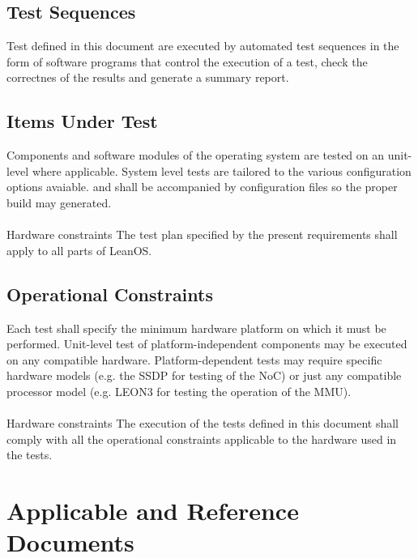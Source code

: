\section{Test Sequences}

Test defined in this document are executed by automated test sequences in the
form of software programs that control the execution of a test, check the
correctnes of the results and generate a summary report.



\section{Items Under Test}

Components and software modules of the operating system are tested on an
unit-level where applicable. System level tests are tailored to the
various configuration options avaiable. and shall be accompanied by
configuration files so the proper build may generated.\\
\\

 {Hardware constraints}{%
The test plan specified by the present requirements shall apply to all parts %
of LeanOS.
}{}



\section{Operational Constraints}

Each test shall specify the minimum hardware platform on which it must be
performed. Unit-level test of platform-independent components may be executed
on any compatible hardware. Platform-dependent tests may require specific
hardware models (e.g. the \gls{SSDP} for testing of the \gls{NoC}) or just any
compatible processor model (e.g. \gls{LEON3} for testing the operation of the
\gls{MMU}).\\
\\

 {Hardware constraints}{%
The execution of the tests defined in this document shall comply with all %
the operational constraints applicable to the hardware used in the tests.%
}{}



\chapter{Applicable and Reference Documents} %

